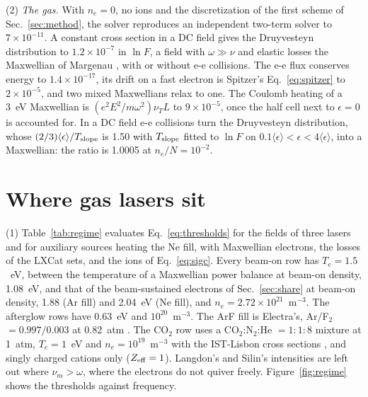 \documentclass[11pt]{article}
\numberwithin{equation}{section}
\begin{document}
{\noindent}(2) \emph{The gas.} With $n_e=0$, no ions and the discretization of
the first scheme of Sec.~\ref{sec:method}, the solver reproduces an independent
two-term solver to $7\times10^{-11}$. A
constant cross section in a DC field gives the Druyvesteyn distribution
\cite{Druyvesteyn1940} to $1.2\times10^{-7}$ in $\ln F$, a field with $\omega\gg\nu$ and
elastic losses the Maxwellian of Margenau \cite{Margenau1946}, with or without
e-e collisions. The e-e flux conserves energy to $1.4\times10^{-17}$, its drift on a fast
electron is Spitzer's Eq.~\eqref{eq:spitzer} to $2\times10^{-5}$, and two mixed
Maxwellians relax to one. The Coulomb heating of a 3~eV Maxwellian is
$(e^2E^2/m\omega^2)\nu_TL$ to $9\times10^{-5}$, once the half cell next to $\epsilon=0$
is accounted for. In a DC field e-e collisions turn the Druyvesteyn
distribution, whose $(2/3)\langle\epsilon\rangle/T_{\rm slope}$ is 1.50 with $T_{\rm slope}$
fitted to $\ln F$ on $0.1\langle\epsilon\rangle<\epsilon<4\langle\epsilon\rangle$, into a
Maxwellian: the ratio is 1.0005 at $n_e/N=10^{-2}$.

\section{Where gas lasers sit}
\label{sec:regime}

{\noindent}(1) Table~\ref{tab:regime} evaluates Eq.~\eqref{eq:thresholds} for the
fields of three lasers and for auxiliary sources heating the Ne fill, with
Maxwellian electrons, the losses of the LXCat sets, and the ions of Eq.~\eqref{eq:sigc}.
Every beam-on row has $T_e=1.5$~eV, between the temperature of a Maxwellian power
balance at beam-on density, 1.08~eV, and that of the beam-sustained electrons of
Sec.~\ref{sec:share} at
beam-on density, 1.88 (Ar fill) and 2.04~eV (Ne fill), and $n_e=2.72\times10^{21}$~m$^{-3}$. The
afterglow rows have 0.63~eV and $10^{20}$~m$^{-3}$. The ArF fill is
Electra's, Ar/F$_2$ $=0.997/0.003$ at 0.82~atm \cite{Obenschain2020}. The CO$_2$ row
uses a CO$_2$:N$_2$:He $=1:1:8$ mixture at 1~atm, $T_e=1$~eV and $n_e=10^{19}$~m$^{-3}$
with the IST-Lisbon cross sections \cite{LXCat}, and singly charged cations only ($Z_{\rm eff}=1$).
Langdon's and Silin's intensities are left out where $\nu_m>\omega$, where the
electrons do not quiver freely. Figure~\ref{fig:regime} shows the thresholds against
frequency.
\end{document}
